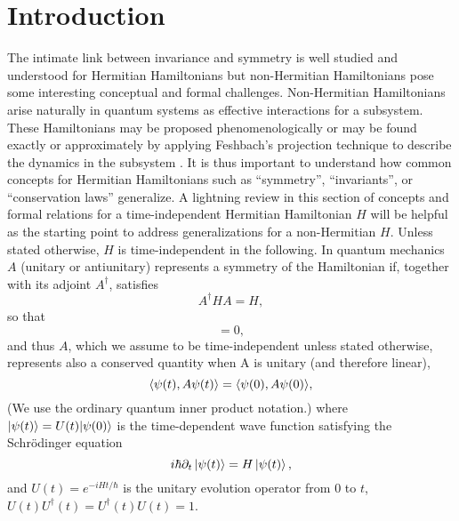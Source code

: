 \section{Introduction}
%
%
%
%
%
%
The intimate link between invariance and symmetry is well studied and understood
for
Hermitian Hamiltonians but non-Hermitian Hamiltonians pose some interesting
conceptual and formal challenges.
Non-Hermitian Hamiltonians arise naturally in quantum systems as effective interactions for a subsystem.
These Hamiltonians may be proposed phenomenologically or may be
found exactly or approximately by applying Feshbach's projection technique to describe the dynamics in
the subsystem \cite{Feshbach1958,Ruschhaupt2004a}.
It is thus  important to understand
how common concepts for Hermitian Hamiltonians such as ``symmetry'',
``invariants'', or ``conservation laws'' generalize.
A lightning review in this section of concepts and formal relations for a time-independent Hermitian Hamiltonian $H$ will
be helpful as the starting point to
address generalizations for a non-Hermitian $H$. Unless stated otherwise, $H$ is time-independent in the following.
In quantum mechanics $A$ (unitary or antiunitary) represents a symmetry of the Hamiltonian if, together with its adjoint $A^\dagger$,
satisfies
%
\begin{equation}
A^\dagger HA=H,
\label{symme}
\end{equation}
%
so that
%
\begin{equation}
[H,A]=0,
\label{conmu}
\end{equation}
%
and thus $A$,  which we assume to be time-independent unless stated otherwise,
represents also a conserved quantity when A is unitary (and therefore linear),
%
\begin{equation}
\la \psi(t),A\psi(t)\ra=\la \psi(0),A \psi(0)\ra,
\label{conser}
\end{equation}
%
(We use the ordinary quantum inner product notation.)
where $|\psi(t)\rangle=U(t)|\psi(0)\rangle$ is the time-dependent wave function
satisfying the  Schr\"odinger equation
%
\begin{equation}
    i\hbar\partial_t\ket{\psi(t)} = H \ket{\psi(t)},
    \label{eq:ScrdngrEqn}
\end{equation}
%
and $U(t)=e^{-iHt/\hbar}$ is the unitary evolution operator from $0$ to $t$,
$U(t)U^\dagger(t)=U^\dagger(t)U(t)=1$.

